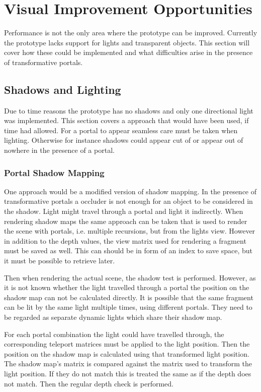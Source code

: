 \chapter{Visual Improvement Opportunities}
Performance is not the only area where the prototype can be improved. Currently the prototype lacks support for lights and transparent objects. This section will cover how these could be implemented and what difficulties arise in the presence of transformative portals.

\section{Shadows and Lighting}
Due to time reasons the prototype has no shadows and only one directional light was implemented. This section covers a approach that would have been used, if time had allowed. For a portal to appear seamless care must be taken when lighting. Otherwise for instance shadows could appear cut of or appear out of nowhere in the presence of a portal.

\subsection{Portal Shadow Mapping}
One approach would be a modified version of shadow mapping. In the presence of transformative portals a occluder is not enough for an object to be considered in the shadow. Light might travel through a portal and light it indirectly. When rendering shadow maps the same approach can be taken that is used to render the scene with portals, i.e. multiple recursions, but from the lights view. However in addition to the depth values, the view matrix used for rendering a fragment must be saved as well. This can should be in form of an index to save space, but it must be possible to retrieve later. 

Then when rendering the actual scene, the shadow test is performed. However, as it is not known whether the light travelled through a portal the position on the shadow map can not be calculated directly. It is possible that the same fragment can be lit by the same light multiple times, using different portals. They need to be regarded as separate dynamic lights which share their shadow map.

For each portal combination the light could have travelled through, the corresponding teleport matrices must be applied to the light position. Then the position on the shadow map is calculated using that transformed light position. The shadow map's matrix is compared against the matrix used to transform the light position. If they do not match this is treated the same as if the depth does not match. Then the regular depth check is performed.

